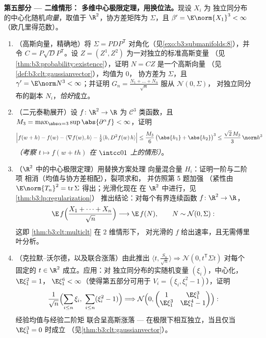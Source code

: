\begin{problem}
\medskip
\noindent\textbf{第五部分 --- 二维情形：
多维中心极限定理，用换位法。}现设 $X_i$ 为
独立同分布的中心化随机\emph{向量}，取值于 $\R^2$，协方差矩阵为
$\Sigma$，且 $\beta' = \E\norm{X_1}^3 <
\infty$（欧几里得范数）。
\begin{enumerate}[resume]
  \item （高斯向量，精确地）将 $\Sigma =
        PDP^{\mathsf T}$ 对角化（见\cref{exo:b3:submanifolds:8}），并
        令 $C = P\sqrt DP^{\mathsf T}$。设 $Z = (Z^1,
        Z^2)$ 为一对独立的标准高斯变量
        （见\cref{thm:b3:probability:existence}），证明 $N
        = CZ$ 是一个高斯向量
        （见\cref{def:b3:clt:gaussianvector}），均值为 $0$，
        协方差为 $\Sigma$，且 $\gamma' = \E\norm N^3 <
        \infty$；并证明 $G_n = \frac{N_1 + \dots +
        N_n}{\sqrt n}$ 服从 $\mathcal N(0, \Sigma)$，
        对独立同分布的副本 $N_i$，\emph{恰好}成立。
  \item （二元泰勒展开）设 $f \colon \R^2 \to
        \R$ 为 $\mathcal C^3$ 类函数，且 $M_3 =
        \max_{\abs\alpha = 3}\sup\abs{\partial^\alpha f} <
        \infty$，证明
        \[
        \Bigl|f(w + h) - f(w) - \langle\nabla f(w),
        h\rangle - \tfrac12\langle h, D^2f(w)\,h\rangle
        \Bigr| \leq \frac{M_3}6\,\bigl(\abs{h_1} +
        \abs{h_2}\bigr)^3 \leq \frac{\sqrt2\,M_3}3\,
        \norm h^3
        \]
        \emph{（考察 $t \mapsto f(w + th)$ 在
        $\intcc01$ 上的情形）}。
  \item （$\R^2$ 中的中心极限定理）用替换方案处理
        向量混合量 $H_i$：证明一阶与二阶项
        相消（均值与协方差相配），裂项求和，
        并仿照第 5 题加强
        （紧性由 $\E\norm{T_n}^2 =
        \operatorname{tr}\Sigma$ 得出；光滑化现在
        在 $\R^2$ 中进行，见\cref{thm:b3:lp:regularization}）
        推出结论：对每个有界连续函数 $f \colon
        \R^2 \to \R$，
        \[
        \E\,f\Bigl(\frac{X_1 + \dots + X_n}{\sqrt n}\Bigr)
        \longrightarrow \E\,f(N), \qquad N \sim \mathcal
        N(0, \Sigma) :
        \]
        这即 \cref{thm:b3:clt:multiclt} 在 $2$ 维情形下，
        对光滑的 $f$ 给出速率，且无需傅里叶分析。
  \item （克拉默--沃尔德，以及联合涨落）由此推出
        $\langle t, \frac{S_n}{\sqrt n}\rangle
        \Rightarrow \mathcal N(0, t^{\mathsf T}\Sigma t)$
        对每个固定的 $t \in \R^2$ 成立。应用：对
        独立同分布的实随机变量 $(\xi_i)$，中心化，$\E\xi_1^2 = 1$，
        $\E\xi_1^6 < \infty$（使得第五部分可用于
        $V_i = (\xi_i, \xi_i^2 - 1)$），证明
        \[
        \frac1{\sqrt n}\Bigl(\sum_{i\leq n}\xi_i,\
        \sum_{i\leq n}(\xi_i^2 - 1)\Bigr) \Longrightarrow
        \mathcal N\Bigl(0, \begin{pmatrix} 1 & \E\xi_1^3\\
        \E\xi_1^3 & \E\xi_1^4 - 1\end{pmatrix}\Bigr) :
        \]
        经验均值与经验二阶矩
        联合呈高斯涨落 --- 在极限下相互独立，当且仅当
        $\E\xi_1^3 = 0$ 时成立
        （见\cref{thm:b3:clt:gaussianvector}）。
\end{enumerate}


\end{problem}
